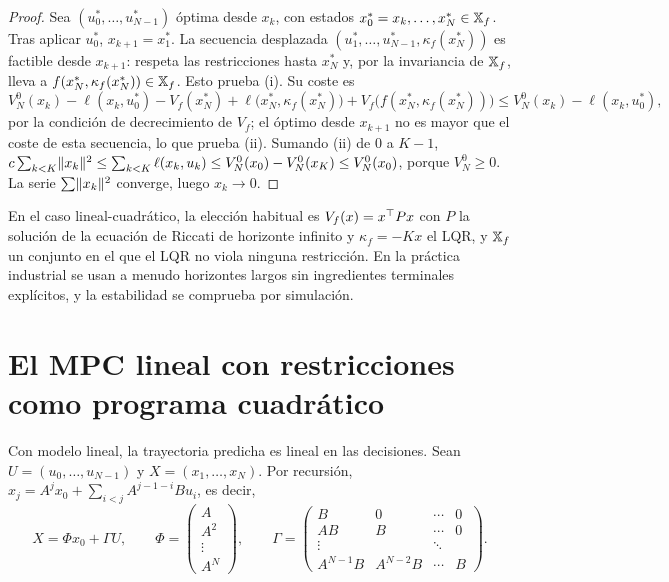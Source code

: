 \begin{proof}
Sea $(u_0^{*},\dots,u_{N-1}^{*})$ óptima desde $x_k$, con estados $x_0^{*}=x_k,\dots,x_N^{*}\in\mathbb{X}_f$. Tras aplicar $u_0^{*}$, $x_{k+1}=x_1^{*}$. La secuencia desplazada $(u_1^{*},\dots,u_{N-1}^{*},\kappa_f(x_N^{*}))$ es factible desde $x_{k+1}$: respeta las restricciones hasta $x_N^{*}$ y, por la invariancia de $\mathbb{X}_f$, lleva a $f(x_N^{*},\kappa_f(x_N^{*}))\in\mathbb{X}_f$. Esto prueba (i). Su coste es
\[
V_N^{0}(x_k)-\ell(x_k,u_0^{*})-V_f(x_N^{*})+\ell\bigl(x_N^{*},\kappa_f(x_N^{*})\bigr)+V_f\bigl(f(x_N^{*},\kappa_f(x_N^{*}))\bigr)\le V_N^{0}(x_k)-\ell(x_k,u_0^{*}),
\]
por la condición de decrecimiento de $V_f$; el óptimo desde $x_{k+1}$ no es mayor que el coste de esta secuencia, lo que prueba (ii). Sumando (ii) de $0$ a $K-1$, $c\sum_{k<K}\lVert x_k\rVert^{2}\le\sum_{k<K}\ell(x_k,u_k)\le V_N^{0}(x_0)-V_N^{0}(x_K)\le V_N^{0}(x_0)$, porque $V_N^{0}\ge0$. La serie $\sum\lVert x_k\rVert^{2}$ converge, luego $x_k\to0$.
\end{proof}

En el caso lineal-cuadrático, la elección habitual es $V_f(x)=x^{\top} Px$ con $P$ la solución de la ecuación de Riccati de horizonte infinito y $\kappa_f=-Kx$ el LQR, y $\mathbb{X}_f$ un conjunto en el que el LQR no viola ninguna restricción. En la práctica industrial se usan a menudo horizontes largos sin ingredientes terminales explícitos, y la estabilidad se comprueba por simulación.

\section{El MPC lineal con restricciones como programa cuadrático}

Con modelo lineal, la trayectoria predicha es lineal en las decisiones. Sean $U=(u_0,\dots,u_{N-1})$ y $X=(x_1,\dots,x_N)$. Por recursión, $x_j=A^{j}x_0+\sum_{i<j}A^{j-1-i}Bu_i$, es decir,
\begin{equation}\label{eq:condensada}
X=\Phi x_0+\Gamma U,\qquad \Phi=\begin{pmatrix}A\\A^{2}\\\vdots\\A^{N}\end{pmatrix},\qquad \Gamma=\begin{pmatrix}B&0&\cdots&0\\AB&B&\cdots&0\\\vdots&&\ddots&\\A^{N-1}B&A^{N-2}B&\cdots&B\end{pmatrix}.
\end{equation}


